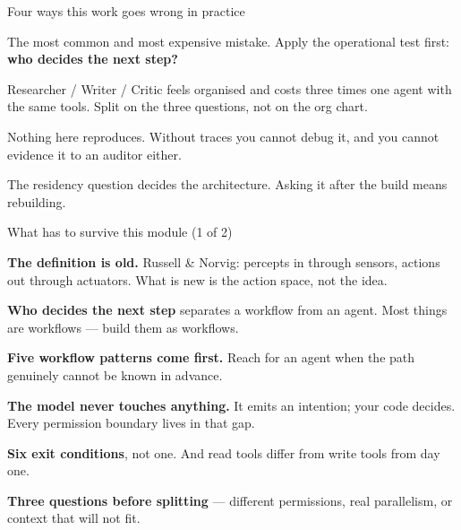 \documentclass[aspectratio=169,11pt,t]{beamer}
\begin{document}
\begin{frame}[shrink=25]{Four ways this work goes wrong in practice}
\begin{minipage}[t]{0.494\textwidth}
\begin{icardbad}
The most common and most expensive mistake. Apply the operational test first: \textbf{who decides the next step?}
\end{icardbad}
\end{minipage}%
\hfill
\begin{minipage}[t]{0.494\textwidth}
\begin{icardbad}
Researcher / Writer / Critic feels organised and costs three times one agent with the same tools. Split on the three questions, not on the org chart.
\end{icardbad}
\end{minipage}%


\vskip 4pt

\begin{minipage}[t]{0.494\textwidth}
\begin{icardwarn}
Nothing here reproduces. Without traces you cannot debug it, and you cannot evidence it to an auditor either.
\end{icardwarn}
\end{minipage}%
\hfill
\begin{minipage}[t]{0.494\textwidth}
\begin{icardwarn}
The residency question decides the architecture. Asking it after the build means rebuilding.
\end{icardwarn}
\end{minipage}%
\end{frame}

\begin{frame}[shrink=25]{What has to survive this module (1 of 2)}
\begin{isteps}
\item \textbf{The definition is old.} Russell \& Norvig: percepts in through sensors, actions out through actuators. What is new is the action space, not the idea.
\item \textbf{Who decides the next step} separates a workflow from an agent. Most things are workflows --- build them as workflows.
\item \textbf{Five workflow patterns come first.} Reach for an agent when the path genuinely cannot be known in advance.
\item \textbf{The model never touches anything.} It emits an intention; your code decides. Every permission boundary lives in that gap.
\item \textbf{Six exit conditions}, not one. And read tools differ from write tools from day one.
\item \textbf{Three questions before splitting} --- different permissions, real parallelism, or context that will not fit.
\end{isteps}
\end{frame}
\end{document}
